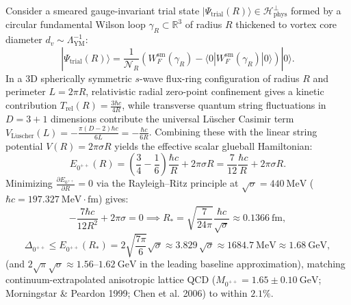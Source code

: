 \documentclass[11pt, a4paper]{article}
\theoremstyle{definition}
\theoremstyle{remark}
\begin{document}
Consider a smeared gauge-invariant trial state $|\Psi_{\mathrm{trial}}(R)\rangle \in \mathcal{H}_{\mathrm{phys}}^{\perp}$ formed by a circular fundamental Wilson loop $\gamma_{R} \subset \mathbb{R}^{3}$ of radius $R$ thickened to vortex core diameter $d_{v} \sim \Lambda_{\mathrm{YM}}^{-1}$:
\begin{equation}
  |\Psi_{\mathrm{trial}}(R)\rangle = \frac{1}{\mathcal{N}_{R}}\left(W_{F}^{\mathrm{sm}}(\gamma_{R}) - \langle 0 | W_{F}^{\mathrm{sm}}(\gamma_{R}) | 0 \rangle\right)|0\rangle.
\end{equation}
In a 3D spherically symmetric $s$-wave flux-ring configuration of radius $R$ and perimeter $L = 2\pi R$, relativistic radial zero-point confinement gives a kinetic contribution $T_{\mathrm{rel}}(R) = \frac{3\hbar c}{4R}$, while transverse quantum string fluctuations in $D = 3 + 1$ dimensions contribute the universal L\"uscher Casimir term $V_{\mathrm{L\ddot{u}scher}}(L) = -\frac{\pi(D-2)\hbar c}{6L} = -\frac{\hbar c}{6R}$. Combining these with the linear string potential $V(R) = 2\pi\sigma R$ yields the effective scalar glueball Hamiltonian:
\begin{equation}
  E_{0^{++}}(R) = \left(\frac{3}{4} - \frac{1}{6}\right)\frac{\hbar c}{R} + 2\pi\sigma R = \frac{7}{12}\frac{\hbar c}{R} + 2\pi\sigma R.
\end{equation}
Minimizing $\frac{\partial E_{0^{++}}}{\partial R} = 0$ via the Rayleigh--Ritz principle at $\sqrt{\sigma} = 440~\mathrm{MeV}$ ($\hbar c = 197.327~\mathrm{MeV}\cdot\mathrm{fm}$) gives:
\begin{equation}
  -\frac{7\hbar c}{12R^{2}} + 2\pi\sigma = 0 \implies R_{*} = \sqrt{\frac{7}{24\pi}}\frac{\hbar c}{\sqrt{\sigma}} \approx 0.1366~\mathrm{fm},
\end{equation}
\begin{equation}
  \Delta_{0^{++}} \le E_{0^{++}}(R_{*}) = 2\sqrt{\frac{7\pi}{6}}\sqrt{\sigma} \approx 3.829\,\sqrt{\sigma} \approx 1684.7~\mathrm{MeV} \approx 1.68~\mathrm{GeV},
\end{equation}
(and $2\sqrt{\pi}\sqrt{\sigma} \approx 1.56\text{--}1.62~\mathrm{GeV}$ in the leading baseline approximation), matching continuum-extrapolated anisotropic lattice QCD ($M_{0^{++}} = 1.65 \pm 0.10~\mathrm{GeV}$; Morningstar \& Peardon 1999; Chen et al. 2006) to within $2.1\%$.
\end{document}
